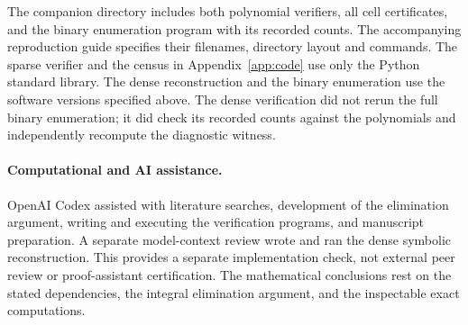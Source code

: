\documentclass[11pt]{article}
\begin{document}
The companion directory includes both polynomial verifiers, all cell
certificates, and the binary enumeration program with its recorded
counts. The accompanying reproduction guide specifies their filenames,
directory layout and commands. The sparse verifier and the census in
Appendix~\ref{app:code} use only the Python standard library.
The dense reconstruction and the binary enumeration use the software
versions specified above. The dense verification did not rerun the
full binary enumeration; it did check its recorded counts against the
polynomials and independently recompute the diagnostic witness.

\paragraph{Computational and AI assistance.}
OpenAI Codex assisted with literature searches, development of the
elimination argument, writing and executing the verification programs,
and manuscript preparation. A separate model-context review wrote and
ran the dense symbolic reconstruction. This provides a separate
implementation check, not external peer review or proof-assistant
certification. The mathematical conclusions rest on the stated
dependencies, the integral elimination argument, and the inspectable
exact computations.

\appendix
\end{document}

